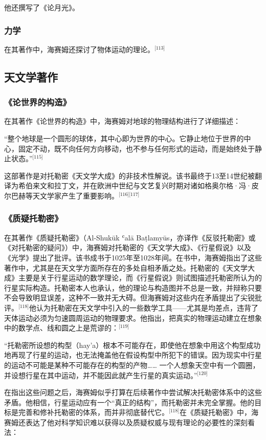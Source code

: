 他还撰写了《论月光》。
\subsubsection{力学}
在其著作中，海赛姆还探讨了物体运动的理论。\(^\text{[113]}\)
\subsection{天文学著作}
\subsubsection{《论世界的构造》}
在其著作《论世界的构造》中，海赛姆对地球的物理结构进行了详细描述：

“整个地球是一个圆形的球体，其中心即为世界的中心。它静止地位于世界的中心，固定不动，既不向任何方向移动，也不参与任何形式的运动，而是始终处于静止状态。”\(^\text{[115]}\)

这部著作是对托勒密《天文学大成》的非技术性解说。该书最终于13至14世纪被翻译为希伯来文和拉丁文，并在欧洲中世纪与文艺复兴时期对诸如格奥尔格·冯·皮尔巴赫等天文学家产生了重要影响。\(^\text{[116][117]}\)
\subsubsection{《质疑托勒密》}
在其著作《质疑托勒密》（Al-Shukūk ʿalā Baṭlamyūs，亦译作《反驳托勒密》或《对托勒密的疑问》）中，海赛姆对托勒密的《天文学大成》、《行星假说》以及《光学》提出了批评。该书成书于1025年至1028年间。在书中，海赛姆指出了这些著作中，尤其是在天文学方面所存在的多处自相矛盾之处。托勒密的《天文学大成》主要是关于行星运动的数学理论，而《行星假说》则试图描述托勒密所认为的行星实际构造。托勒密本人也承认，他的理论与构造图并不总是一致，并辩称只要不会导致明显误差，这种不一致并无大碍。但海赛姆对这些内在矛盾提出了尖锐批评。\(^\text{[118]}\)他认为托勒密在天文学中引入的一些数学工具——尤其是均差点，违背了天体运动必须为匀速圆周运动的物理要求。他指出，把真实的物理运动建立在想象中的数学点、线和圆之上是荒谬的：\(^\text{[119]}\)

“托勒密所设想的构型（hay’a）根本不可能存在，即使他在想象中用这个构型成功地再现了行星的运动，也无法掩盖他在假设构型中所犯下的错误。因为现实中行星的运动不可能是某种不可能存在的构型的产物……
一个人想象天空中有一个圆圈，并设想行星在其中运动，并不能因此就产生行星的真实运动。”\(^\text{[120]}\)

在指出这些问题之后，海赛姆似乎打算在后续著作中尝试解决托勒密体系中的这些矛盾。他相信，行星运动应有一个“真正的结构”，而托勒密并未完全掌握。他的目标是完善和修补托勒密的体系，而并非彻底替代它。\(^\text{[118]}\)在《质疑托勒密》中，海赛姆还表达了他对科学知识难以获得以及质疑权威与现有理论的必要性的深刻看法：

